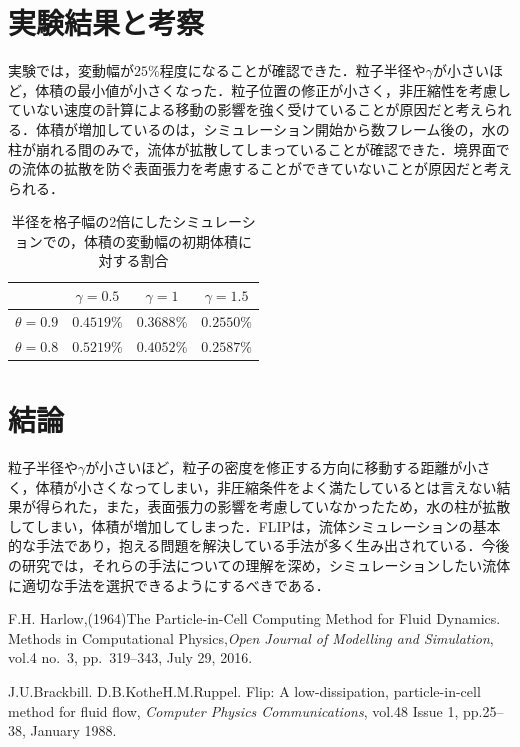 \documentclass[10pt,a4paper,notitlepage,oneside,twocolumn]{abst_jsarticle}
\begin{document}
\section{実験結果と考察} \label{chapter:6}

実験では，変動幅が$25\%$程度になることが確認できた．粒子半径や$\gamma$が小さいほど，体積の最小値が小さくなった．粒子位置の修正が小さく，非圧縮性を考慮していない速度の計算による移動の影響を強く受けていることが原因だと考えられる．体積が増加しているのは，シミュレーション開始から数フレーム後の，水の柱が崩れる間のみで，流体が拡散してしまっていることが確認できた．境界面での流体の拡散を防ぐ表面張力を考慮することができていないことが原因だと考えられる．
\begin{table}[h]
    \centering
    \caption{半径を格子幅の2倍にしたシミュレーションでの，体積の変動幅の初期体積に対する割合} \label{table:r2dx}
    \begin{tabular}{|l|c|c|c|}
    \hline
                			 	& $\gamma = 0.5$	 	& $\gamma =1$ 	 & $\gamma =1.5$ 		\\\hline\hline
     $\theta = 0.9$  	 & $0.4519\%$ & $0.3688\%$ & $0.2550\%$     \\
     $\theta = 0.8$      & $0.5219\%$ & $0.4052\%$ & $0.2587\%$ \\      \hline
    \end{tabular}
  \end{table}
\section{結論} \label{chapter:7}
粒子半径や$\gamma$が小さいほど，粒子の密度を修正する方向に移動する距離が小さく，体積が小さくなってしまい，非圧縮条件をよく満たしているとは言えない結果が得られた，また，表面張力の影響を考慮していなかったため，水の柱が拡散してしまい，体積が増加してしまった．FLIPは，流体シミュレーションの基本的な手法であり，抱える問題を解決している手法が多く生み出されている．今後の研究では，それらの手法についての理解を深め，シミュレーションしたい流体に適切な手法を選択できるようにするべきである．
\begin{thebibliography}{99}

 F.H. Harlow,(1964)The Particle-in-Cell Computing Method for Fluid Dynamics. Methods in Computational Physics,\textit{Open Journal of Modelling and Simulation},  vol.4 no.~3, pp.~319--343, July 29, 2016.

J.U.Brackbill. D.B.KotheH.M.Ruppel. Flip: A low-dissipation, particle-in-cell method for fluid flow, \textit{Computer Physics Communications}, vol.48 Issue 1, pp.25--38, January 1988.

\end{thebibliography}
\end{document}

